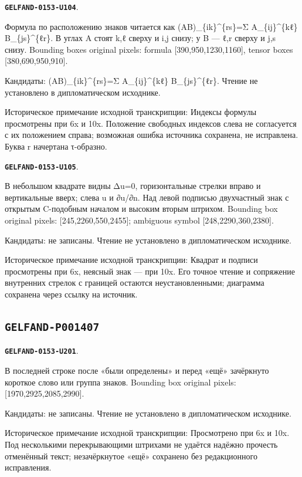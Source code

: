 \documentclass[11pt]{article}
\theoremstyle{definition}
\theoremstyle{remark}
\begin{document}
\par\noindent\leavevmode{}\label{GELFAND-0153-U104}\label{GELFAND-P001406:tensor-indices:note}\textbf{\texttt{GELFAND-0153-U104}}.\nopagebreak[4]\par
Формула по расположению знаков читается как (AB)\_\{ik\}\textasciicircum{}\{rs\}=Σ A\_\{ij\}\textasciicircum{}\{kℓ\} B\_\{js\}\textasciicircum{}\{ℓr\}. В углах A стоят k,ℓ сверху и i,j снизу; у B — ℓ,r сверху и j,s снизу. Bounding boxes original pixels: formula [390,950,1230,1160], tensor boxes [380,690,950,910].\par
Кандидаты: (AB)\_\{ik\}\textasciicircum{}\{rs\}=Σ A\_\{ij\}\textasciicircum{}\{kℓ\} B\_\{js\}\textasciicircum{}\{ℓr\}. Чтение не установлено в дипломатическом исходнике.\par
Историческое примечание исходной транскрипции: Индексы формулы просмотрены при 6x и 10x. Положение свободных индексов слева не согласуется с их положением справа; возможная ошибка источника сохранена, не исправлена. Буква r начертана τ-образно.\par\medskip
\par\noindent\leavevmode{}\label{GELFAND-0153-U105}\label{GELFAND-P001406:boundary-diagram:note}\textbf{\texttt{GELFAND-0153-U105}}.\nopagebreak[4]\par
В небольшом квадрате видны Δu=0, горизонтальные стрелки вправо и вертикальные вверх; слева u и ∂u/∂n. Над левой подписью двухчастный знак с открытым C-подобным началом и высоким вторым штрихом. Bounding box original pixels: [245,2260,550,2455]; ambiguous symbol [248,2290,360,2380].\par
Кандидаты: не записаны. Чтение не установлено в дипломатическом исходнике.\par
Историческое примечание исходной транскрипции: Квадрат и подписи просмотрены при 6x, неясный знак — при 10x. Его точное чтение и сопряжение внутренних стрелок с границей остаются неустановленными; диаграмма сохранена через ссылку на источник.\par\medskip
\subsection*{\texttt{GELFAND-P001407}}
\par\noindent\leavevmode{}\label{GELFAND-0153-U201}\label{GELFAND-P001407:last-line-cancellation:note}\textbf{\texttt{GELFAND-0153-U201}}.\nopagebreak[4]\par
В последней строке после «были определены» и перед «ещё» зачёркнуто короткое слово или группа знаков. Bounding box original pixels: [1970,2925,2085,2990].\par
Кандидаты: не записаны. Чтение не установлено в дипломатическом исходнике.\par
Историческое примечание исходной транскрипции: Просмотрено при 6x и 10x. Под несколькими перекрывающими штрихами не удаётся надёжно прочесть отменённый текст; незачёркнутое «ещё» сохранено без редакционного исправления.\par\medskip
\end{document}
